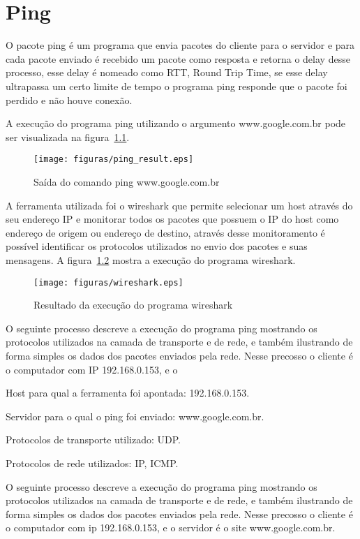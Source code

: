 \chapter{Ping}

O pacote ping é um programa que envia pacotes do cliente para o servidor e para
cada pacote enviado é recebido um pacote como resposta e retorna o delay desse
processo, esse delay é nomeado como RTT, Round Trip Time, se esse delay
ultrapassa um certo limite de tempo o programa ping responde que o pacote foi
perdido e não houve conexão.

A execução do programa ping utilizando o argumento www.google.com.br pode ser
visualizada na figura~\ref{fig:ping_result}.

\begin{figure}[h]
  \centering
  \texttt{[image: figuras/ping\_result.eps]}
  \caption{Saída do comando ping www.google.com.br}
  \label{fig:ping_result}
\end{figure}

A ferramenta utilizada foi o wireshark que permite selecionar um host através
do seu endereço IP e monitorar todos os pacotes que possuem o IP do host como
endereço de origem ou endereço de destino, através desse monitoramento é
possível identificar os protocolos utilizados no envio dos pacotes e suas
mensagens. A figura~\ref{fig:wireshark_result} mostra a execução do programa
wireshark.

\begin{figure}[h]
  \centering
  \texttt{[image: figuras/wireshark.eps]}
  \caption{Resultado da execução do programa wireshark}
  \label{fig:wireshark_result}
\end{figure}

O seguinte processo descreve a execução do programa ping mostrando os
protocolos utilizados na camada de transporte e de rede, e também
ilustrando de forma simples os dados dos pacotes enviados pela rede.
Nesse precosso o cliente é o computador com IP 192.168.0.153, e o

Host para qual a ferramenta foi apontada: 192.168.0.153.

Servidor para o qual o ping foi enviado: www.google.com.br.

Protocolos de transporte utilizado: UDP.

Protocolos de rede utilizados: IP, ICMP.

O seguinte processo descreve a execução do programa ping mostrando os
protocolos utilizados na camada de transporte e de rede, e também
ilustrando de forma simples os dados dos pacotes enviados pela rede.
Nesse precosso o cliente é o computador com ip 192.168.0.153, e o
servidor é o site www.google.com.br.


